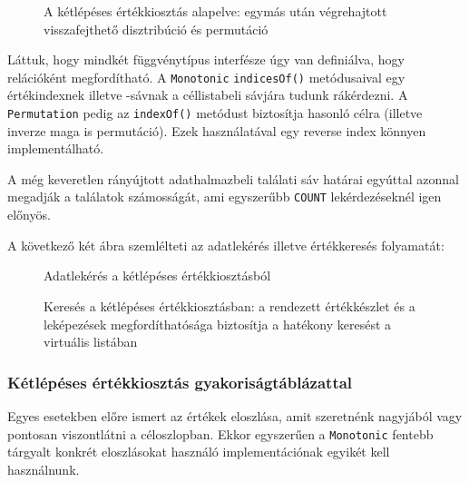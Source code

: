 \documentclass[
    parspace,
    noindent,
    nohyp,
]{elteiktdk}[2023/04/10]
\begin{document}
\begin{figure}[H]
\centering

\caption[A kétlépéses értékkiosztás alapelve]{
    A kétlépéses értékkiosztás alapelve:
    egymás után végrehajtott visszafejthető disztribúció és permutáció
}
\end{figure}

Láttuk, hogy mindkét függvénytípus interfésze úgy van definiálva, hogy relációként megfordítható.
A \texttt{Monotonic} \texttt{indicesOf()} metódusaival egy értékindexnek illetve -sávnak
a céllistabeli sávjára tudunk rákérdezni.
A \texttt{Permutation} pedig az \texttt{indexOf()} metódust biztosítja hasonló célra
(illetve inverze maga is permutáció).
Ezek használatával egy reverse index könnyen implementálható.

A még keveretlen rányújtott adathalmazbeli találati sáv határai
egyúttal azonnal megadják a találatok számosságát,
ami egyszerűbb \texttt{COUNT} lekérdezéseknél igen előnyös.

A következő két ábra szemlélteti az adatlekérés illetve értékkeresés folyamatát:

\begin{figure}[H]
  \centering
  \begin{minipage}[t]{0.48\textwidth}
    
    \caption{Adatlekérés a kétlépéses értékkiosztásból}
  \end{minipage}
  \hspace*{\fill}
  \begin{minipage}[t]{0.48\textwidth}
    
    \caption[Keresés a kétlépéses értékkiosztásban]{
      Keresés a kétlépéses értékkiosztásban:
      a rendezett értékkészlet és a leképezések megfordíthatósága
      biztosítja a hatékony keresést a virtuális listában
    }
  \end{minipage}
\end{figure}

\subsubsection{Kétlépéses értékkiosztás gyakoriságtáblázattal}

Egyes esetekben előre ismert az értékek eloszlása,
amit szeretnénk nagyjából vagy pontosan viszontlátni a céloszlopban.
Ekkor egyszerűen a \texttt{Monotonic} fentebb tárgyalt konkrét eloszlásokat használó
implementációnak egyikét kell használnunk.
\end{document}
